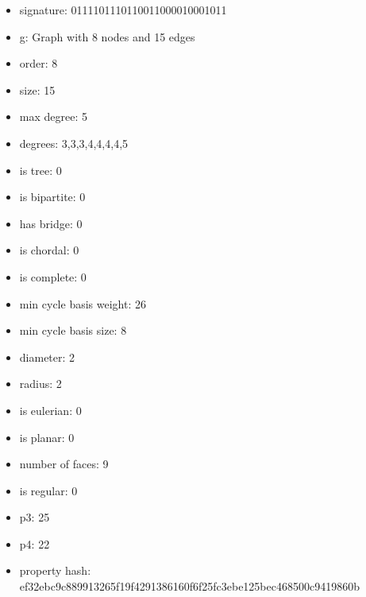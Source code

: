 \begin{itemize}
\item signature: 0111101110110011000010001011
\item g: Graph with 8 nodes and 15 edges
\item order: 8
\item size: 15
\item max degree: 5
\item degrees: 3,3,3,4,4,4,4,5
\item is tree: 0
\item is bipartite: 0
\item has bridge: 0
\item is chordal: 0
\item is complete: 0
\item min cycle basis weight: 26
\item min cycle basis size: 8
\item diameter: 2
\item radius: 2
\item is eulerian: 0
\item is planar: 0
\item number of faces: 9
\item is regular: 0
\item p3: 25
\item p4: 22
\item property hash: ef32ebc9c889913265f19f4291386160f6f25fc3ebe125bec468500c9419860b
\end{itemize}
\newpage
\begin{figure}
\end{figure}
